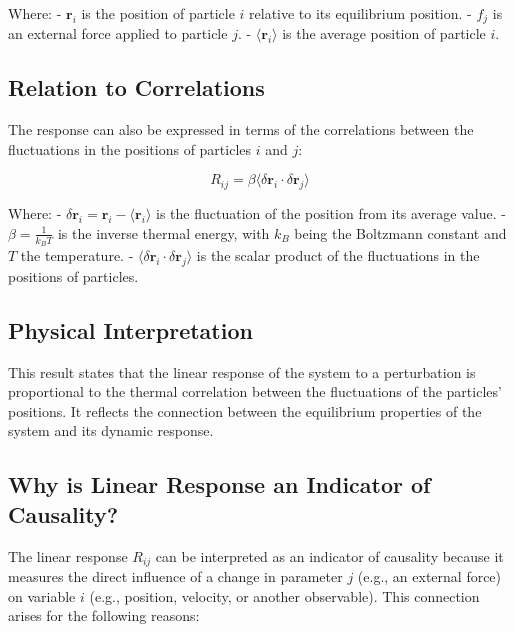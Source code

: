 \documentclass[English, Lau, oneside]{sapthesis}
\begin{document}
\begin{itemize}
Where:
- \(\mathbf{r}_i\) is the position of particle \(i\) relative to its equilibrium position.
- \(f_j\) is an external force applied to particle \(j\).
- \(\langle \mathbf{r}_i \rangle\) is the average position of particle \(i\).

\subsection*{Relation to Correlations}

The response can also be expressed in terms of the correlations between the fluctuations in the positions of particles \(i\) and \(j\):

\[
R_{ij} = \beta \langle \delta \mathbf{r}_i \cdot \delta \mathbf{r}_j \rangle
\]

Where:
- \(\delta \mathbf{r}_i = \mathbf{r}_i - \langle \mathbf{r}_i \rangle\) is the fluctuation of the position from its average value.
- \(\beta = \frac{1}{k_B T}\) is the inverse thermal energy, with \(k_B\) being the Boltzmann constant and \(T\) the temperature.
- \(\langle \delta \mathbf{r}_i \cdot \delta \mathbf{r}_j \rangle\) is the scalar product of the fluctuations in the positions of particles.

\subsection*{Physical Interpretation}

This result states that the linear response of the system to a perturbation is proportional to the thermal correlation between the fluctuations of the particles' positions. It reflects the connection between the equilibrium properties of the system and its dynamic response.

\subsection*{Why is Linear Response an Indicator of Causality?}

The linear response \(R_{ij}\) can be interpreted as an indicator of causality because it measures the direct influence of a change in parameter \(j\) (e.g., an external force) on variable \(i\) (e.g., position, velocity, or another observable). This connection arises for the following reasons:


\end{itemize}
\end{document}

